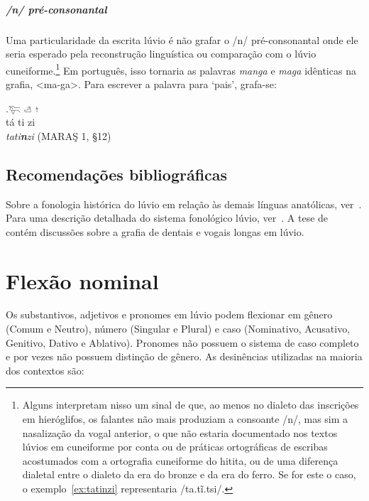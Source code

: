 \paragraph{/n/ pré\hyp{}consonantal}
Uma particularidade da escrita lúvio é não grafar o /n/
pré\hyp{}consonantal onde ele seria esperado pela reconstrução linguística ou
comparação com o lúvio cuneiforme.\footnote{%
	Alguns interpretam nisso um sinal de que, ao menos no dialeto das inscrições
	em hieróglifos, os falantes não mais produziam a consoante /n/, mas sim
	a nasalização da vogal anterior, o que não estaria documentado nos textos
	lúvios em cuneiforme por conta ou de práticas ortográficas de escribas
	acostumados com a ortografia cuneiforme do hitita, ou de uma diferença
	dialetal entre o dialeto da era do bronze e da era do ferro. Se for este o
	caso, o exemplo~\ref{ex:tatinzi} representaria /ta.tĩ.tsi/.}
Em português, isso tornaria as palavras \emph{manga} e \emph{maga} idênticas na
grafia, <ma-ga>.
Para escrever a palavra para `pais', grafa-se:

\exg.\label{ex:tatinzi}\Large 𔐞 \Large 𔑣 \Large 𔖩\\
tá ti zi\\
\emph{tati\textbf{n}zi}  (MARAŞ 1, §12)



\section{Recomendações bibliográficas}

Sobre a fonologia histórica do lúvio em relação às demais línguas anatólicas,
ver~\citet[p. 229ff.]{Melchert1994}.
Para uma descrição detalhada do sistema fonológico lúvio,
ver~\citet[p. 177ff.]{MelchertLanguage}.
A tese de~\citet{Vertegaal2020} contém discussões sobre a grafia de dentais e
vogais longas em lúvio.

\chapter{Flexão nominal}

Os substantivos, adjetivos e pronomes em lúvio podem flexionar em gênero (Comum e Neutro),
número (Singular e Plural) e caso (Nominativo, Acusativo, Genitivo, Dativo e
Ablativo).
Pronomes não possuem o sistema de caso completo e por vezes não possuem
distinção de gênero.
As desinências utilizadas na maioria dos contextos são:

